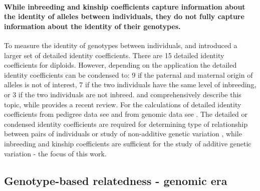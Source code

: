\paragraph{While inbreeding and kinship coefficients capture information
about the identity of alleles between individuals, they do not fully
capture information about the identity of their genotypes.}
%
To measure the identity of genotypes between individuals,
\cite{harris1964genotypic} and \cite{gillois1965relation} introduced
a larger set of detailed identity coefficients.
%
There are 15 detailed identity coefficients for diploids.
%
However, depending on the application the detailed identity coefficients
can be condensed to:
9 if the paternal and maternal origin of alleles is not of interest,
7 if the two individuals have the same level of inbreeding, or
3 if the two individuals are not inbreed.
%
\cite{jacquard1972what} and \cite{jacquard1974genetic} comprehensively
describe this topic, while \cite{weir2006genetic} provides a recent review.
%
For the calculations of detailed identity coefficients
from pedigree data see
\cite{jacquard1966logique, cockerham1971higher, karigl1981recursive, garciacortes2015novel}
and from genomic data see
\cite{csuros2014nonidentifiability, garciacortes2014coefficient,
ackerman2017estimating, graffelman2024estimation}.
%
The detailed or condensed identity coefficients are required for 
determining type of relationship between pairs of individuals
\citep[e.g.][]{thompson1975estimation, weir2006genetic} or 
study of non-additive genetic variation
\citep{jacquard1974genetic, lynch1998genetics, slatkin2002modern, barton2023infinitesimal},
while inbreeding and kinship coefficients are sufficient for the study of
additive genetic variation - the focus of this work.


\subsection{Genotype-based relatedness - genomic era}

